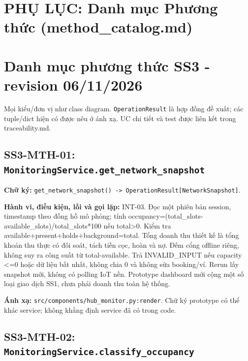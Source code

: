 \documentclass[11pt,a4paper]{article}
\begin{document}
\section*{PHỤ LỤC: Danh mục Phương thức (method\_catalog.md)}
\hypertarget{danh-mux1ee5c-phux1b0ux1a1ng-thux1ee9c-ss3---revision-06112026}{%
\section{Danh mục phương thức SS3 - revision
06/11/2026}\label{danh-mux1ee5c-phux1b0ux1a1ng-thux1ee9c-ss3---revision-06112026}}

Mọi kiểu/đơn vị như class diagram. \texttt{OperationResult} là hợp đồng
đề xuất; các tuple/dict hiện có được nêu ở ánh xạ. UC chi tiết và test
được liên kết trong traceability.md.

\hypertarget{ss3-mth-01-monitoringservice.get_network_snapshot}{%
\subsection{\texorpdfstring{SS3-MTH-01:
\texttt{MonitoringService.get\_network\_snapshot}}{SS3-MTH-01: MonitoringService.get\_network\_snapshot}}\label{ss3-mth-01-monitoringservice.get_network_snapshot}}

\textbf{Chữ ký:}
\texttt{get\_network\_snapshot()\ -\textgreater{}\ OperationResult{[}NetworkSnapshot{]}}.

\textbf{Hành vi, điều kiện, lỗi và gọi lặp:} INT-03. Đọc một phiên bản
session, timestamp theo đồng hồ mô phỏng; tính
occupancy=(total\_slots-available\_slots)/total\_slots*100 nếu
total\textgreater0. Kiểm tra available+present+holds+background=total.
Tổng doanh thu thiết kế là tổng khoản thu thực có đối soát, tách tiền
cọc, hoàn và nợ. Đếm cổng offline riêng, không suy ra công suất từ
total-available. Trả INVALID\_INPUT nếu capacity \textless=0 hoặc dữ
liệu bất nhất, không chia 0 và không sửa booking/ví. Rerun lấy snapshot
mới, không có polling IoT nền. Prototype dashboard mới cộng một số loại
giao dịch SS1, chưa phải doanh thu toàn hệ thống.

\textbf{Ánh xạ:} \texttt{src/components/hub\_monitor.py:render}. Chữ ký
prototype có thể khác service; không khẳng định service đã có trong
code.

\hypertarget{ss3-mth-02-monitoringservice.classify_occupancy}{%
\subsection{\texorpdfstring{SS3-MTH-02:
\texttt{MonitoringService.classify\_occupancy}}{SS3-MTH-02: MonitoringService.classify\_occupancy}}\label{ss3-mth-02-monitoringservice.classify_occupancy}}
\end{document}
